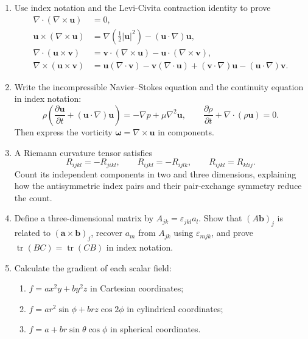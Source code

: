 \begin{enumerate}
    \item\label{ex:vector-calculus-identities} Use index notation and the Levi-Civita contraction identity to prove
    \begin{align*}
        \nabla\cdot(\nabla\times\mathbf{u})&=0,\\
        \mathbf{u}\times(\nabla\times\mathbf{u})
        &=\nabla\left(\frac12|\mathbf{u}|^2\right)-(\mathbf{u}\cdot\nabla)\mathbf{u},\\
        \nabla\cdot(\mathbf{u}\times\mathbf{v})
        &=\mathbf{v}\cdot(\nabla\times\mathbf{u})-\mathbf{u}\cdot(\nabla\times\mathbf{v}),\\
        \nabla\times(\mathbf{u}\times\mathbf{v})
        &=\mathbf{u}(\nabla\cdot\mathbf{v})-\mathbf{v}(\nabla\cdot\mathbf{u})
        +(\mathbf{v}\cdot\nabla)\mathbf{u}-(\mathbf{u}\cdot\nabla)\mathbf{v}.
    \end{align*}

    \item\label{ex:navier-stokes-index} Write the incompressible Navier--Stokes equation and the continuity equation in index notation:
    \begin{equation*}
        \rho\left(\frac{\partial\mathbf{u}}{\partial t}
        +(\mathbf{u}\cdot\nabla)\mathbf{u}\right)
        =-\nabla p+\mu\nabla^2\mathbf{u},
        \qquad
        \frac{\partial\rho}{\partial t}+\nabla\cdot(\rho\mathbf{u})=0.
    \end{equation*}
    Then express the vorticity $\boldsymbol{\omega}=\nabla\times\mathbf{u}$ in components.

    \item\label{ex:riemann-components} A Riemann curvature tensor satisfies
    \begin{equation*}
        R_{ijkl}=-R_{jikl},
        \qquad
        R_{ijkl}=-R_{ijlk},
        \qquad
        R_{ijkl}=R_{klij}.
    \end{equation*}
    Count its independent components in two and three dimensions, explaining how the antisymmetric index pairs and their pair-exchange symmetry reduce the count.

    \item\label{ex:cross-product-matrix} Define a three-dimensional matrix by $A_{jk}=\varepsilon_{jkl}a_l$. Show that $(A\mathbf{b})_j$ is related to $(\mathbf{a}\times\mathbf{b})_j$, recover $a_m$ from $A_{jk}$ using $\varepsilon_{mjk}$, and prove $\operatorname{tr}(BC)=\operatorname{tr}(CB)$ in index notation.

    \item\label{ex:gradient-coordinates} Calculate the gradient of each scalar field:
    \begin{enumerate}
        \item $f=ax^2y+by^2z$ in Cartesian coordinates;
        \item $f=ar^2\sin\phi+brz\cos2\phi$ in cylindrical coordinates;
        \item $f=a+br\sin\theta\cos\phi$ in spherical coordinates.
    \end{enumerate}


\end{enumerate}
